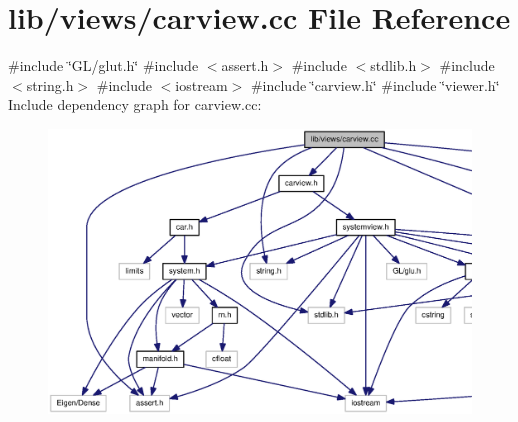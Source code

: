 \section{lib/views/carview.cc \-File \-Reference}
\label{carview_8cc}
{\ttfamily \#include \char`\"{}\-G\-L/glut.\-h\char`\"{}}\*
{\ttfamily \#include $<$assert.\-h$>$}\*
{\ttfamily \#include $<$stdlib.\-h$>$}\*
{\ttfamily \#include $<$string.\-h$>$}\*
{\ttfamily \#include $<$iostream$>$}\*
{\ttfamily \#include \char`\"{}carview.\-h\char`\"{}}\*
{\ttfamily \#include \char`\"{}viewer.\-h\char`\"{}}\*
\-Include dependency graph for carview.\-cc\-:\nopagebreak
\begin{figure}[H]
\begin{center}
\leavevmode
\includegraphics[width=350pt]{carview_8cc__incl}
\end{center}
\end{figure}
